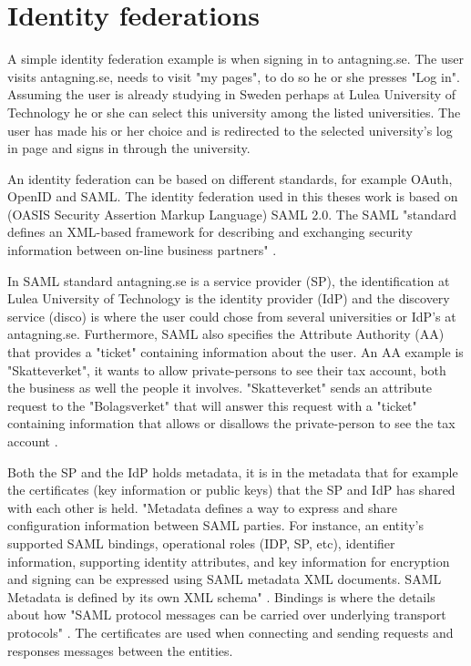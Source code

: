 \section{Identity federations}
A simple identity federation example is when signing in to antagning.se. 
The user visits antagning.se, needs to visit "my pages", to do so he or she presses "Log in". 
Assuming the user is already studying in Sweden perhaps at Lulea University of Technology he or 
she can select this university among the listed universities. 
The user has made his or her choice and is redirected to the selected university's log in page and signs in through the university. 

An identity federation can be based on different standards, for example OAuth, OpenID and SAML. 
The identity federation used in this theses work is based on (OASIS Security Assertion Markup Language) SAML 2.0. 
The SAML "standard defines an XML-based framework for describing and exchanging security information between on-line business partners"
\cite[p.~8]{pdf:oasis-open}.    

In SAML standard antagning.se is a service provider (SP), the identification at Lulea University of Technology 
is the identity provider (IdP) and the discovery service (disco) is where the user could chose from several 
universities or IdP's at antagning.se. Furthermore, SAML also specifies the Attribute Authority (AA) that provides 
a "ticket" containing information about the user. An AA example is "Skatteverket", it wants to 
allow private-persons to see their tax account, both the business as well the people it involves. 
"Skatteverket" sends an attribute request to the "Bolagsverket" that will answer this request 
with a "ticket" containing information that allows or disallows the private-person to see the tax account \cite[p.~284]{pdf:SOU}.

Both the SP and the IdP holds metadata, it is in the metadata that for example the certificates 
(key information or public keys) that the SP and IdP has shared with each other is held. 
"Metadata defines a way to express and share configuration information between SAML parties. 
For instance, an entity's supported SAML bindings, operational roles (IDP, SP, etc), identifier information, 
supporting identity attributes, and key information for encryption and signing can be expressed using SAML 
metadata XML documents. SAML Metadata is defined by its own XML schema" \cite[p.~16]{pdf:oasis-open}. 
Bindings is where the details about how "SAML protocol messages can be carried over underlying transport protocols" 
\cite[p.~18]{pdf:oasis-open}.  
The certificates are used when connecting and sending requests and responses messages between the entities.

